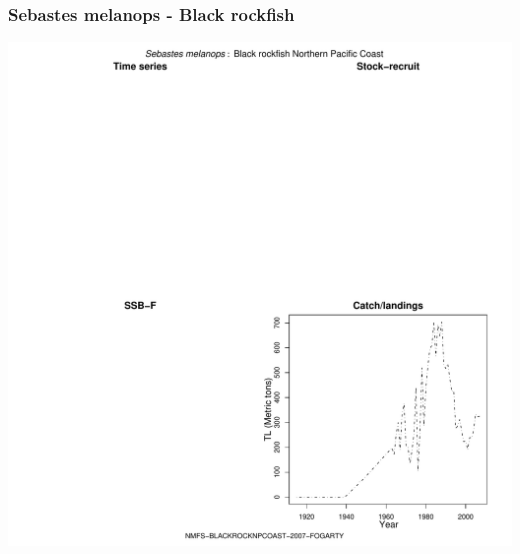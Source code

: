 \subsubsection{Sebastes melanops - Black rockfish}
\begin{center}
\includegraphics[width=1.2\textwidth]{../R/figures/NMFS-BLACKROCKNPCOAST-2007-FOGARTY.pdf}
\end{center}

